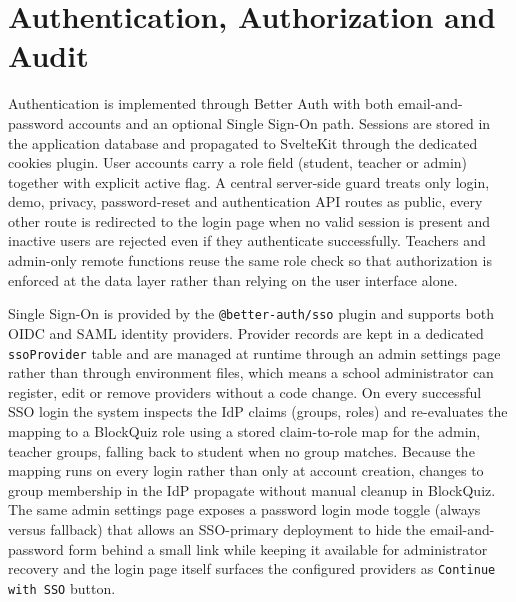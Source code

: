 \section{Authentication, Authorization and Audit}
\label{sec:authentication-authorization-audit}
Authentication is implemented through Better Auth with both email-and-password accounts and an optional Single Sign-On path.
Sessions are stored in the application database and propagated to SvelteKit through the dedicated cookies plugin. 
User accounts carry a role field (student, teacher or admin) together with explicit active flag.
A central server-side guard treats only login, demo, privacy, password-reset and authentication API routes as public, 
every other route is redirected to the login page when no valid session is present and inactive users are 
rejected even if they authenticate successfully. 
Teachers and admin-only remote functions reuse the same role check so that authorization is enforced at the data layer rather
than relying on the user interface alone.

Single Sign-On is provided by the \texttt{@better-auth/sso} plugin and supports both OIDC and SAML identity providers. 
Provider records are kept in a dedicated \texttt{ssoProvider} table and are managed at runtime through an admin settings 
page rather than through environment files, which means a school administrator can register, edit or remove providers without 
a code change. On every successful SSO login the system inspects the IdP claims (groups, roles) and re-evaluates 
the mapping to a BlockQuiz role using a stored claim-to-role map for the admin, teacher groups, falling back to 
student when no group matches. Because the mapping runs on every login rather than only at account creation, 
changes to group membership in the IdP propagate without manual cleanup in BlockQuiz.
The same admin settings page exposes a password login mode toggle (always versus fallback) that allows an SSO-primary 
deployment to hide the email-and-password form behind a small link while keeping it available for
administrator recovery and the login page itself surfaces the configured providers as \texttt{Continue with SSO} button.

